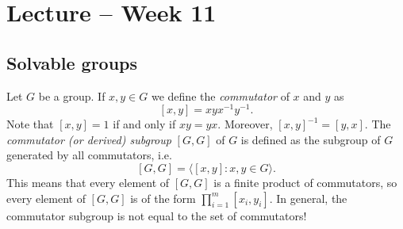 \section{Lecture -- Week 11}

\subsection{Solvable groups}

Let $G$ be a group. If $x,y\in G$ we define
the \emph{commutator} of $x$ and $y$ as
\[
[x,y]=xyx^{-1}y^{-1}.
\]
Note that $[x,y]=1$ if and only if $xy=yx$. 
Moreover, $[x,y]^{-1}=[y,x]$. 
The
\emph{commutator (or derived) subgroup} $[G,G]$ of $G$ is defined as
the subgroup of $G$ generated by all commutators, i.e. 
\[
[G,G]=\langle [x,y]:x,y\in G\rangle.
\]
This means that every element of $[G,G]$ is a finite product of commutators, 
so every element of $[G,G]$ is of the form $\prod_{i=1}^m [x_i,y_i]$. 
In general, the commutator subgroup is not equal to the set of commutators!

